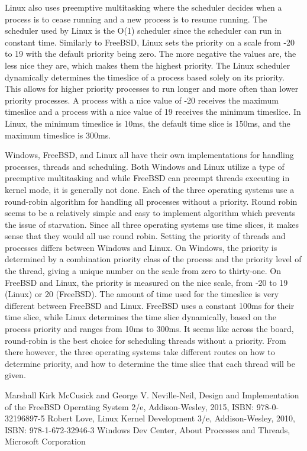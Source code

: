 \documentclass[letterpaper,10pt,draftclsnofoot,onecolumn,titlepage]{IEEEtran}
\begin{document}
		\par
		Linux also uses preemptive multitasking where the scheduler decides when a process is to cease running and a new process is to resume running. The scheduler used by Linux is the O(1) scheduler since the scheduler can run in constant time. Similarly to FreeBSD, Linux sets the priority on a scale from -20 to 19 with the default priority being zero. The more negative the values are, the less nice they are, which makes them the highest priority. The Linux scheduler dynamically determines the timeslice of a process based solely on its priority. This allows for higher priority processes to run longer and more often than lower priority processes. A process with a nice value of {-20} receives the maximum timeslice and a process with a nice value of 19 receives the minimum timeslice. In Linux, the minimum timeslice is 10ms, the default time slice is 150ms, and the maximum timeslice is 300ms.
		\par
		Windows, FreeBSD, and Linux all have their own implementations for handling processes, threads and scheduling. Both Windows and Linux utilize a type of preemptive multitasking and while FreeBSD can preempt threads executing in kernel mode, it is generally not done. Each of the three operating systems use a round-robin algorithm for handling all processes without a priority. Round robin seems to be a relatively simple and easy to implement algorithm which prevents the issue of starvation. Since all three operating systems use time slices, it makes sense that they would all use round robin. Setting the priority of threads and processes differs between Windows and Linux. On Windows, the priority is determined by a combination priority class of the process and the priority level of the thread, giving a unique number on the scale from zero to thirty-one. On FreeBSD and Linux, the priority is measured on the nice scale, from -20 to 19 (Linux) or 20 (FreeBSD). The amount of time used for the timeslice is very different between FreeBSD and Linux. FreeBSD uses a constant 100ms for their time slice, while Linux determines the time slice dynamically, based on the process priority and ranges from 10ms to 300ms. It seems like across the board, round-robin is the best choice for scheduling threads without a priority. From there however, the three operating systems take different routes on how to determine priority, and how to determine the time slice that each thread will be given.

	\clearpage
		
	\begin{thebibliography}{3}
			Marshall Kirk McCusick and George V. Neville-Neil,
			Design and Implementation of the FreeBSD Operating System 2/e,
			Addison-Wesley,
			2015,
			ISBN: 978-0-32196897-5
			Robert Love,
			Linux Kernel Development 3/e,
			Addison-Wesley,
			2010,
			ISBN: 978-1-672-32946-3
			Windows Dev Center,
			About Processes and Threads,
			Microsoft Corporation
	\end{thebibliography}
\end{document}
